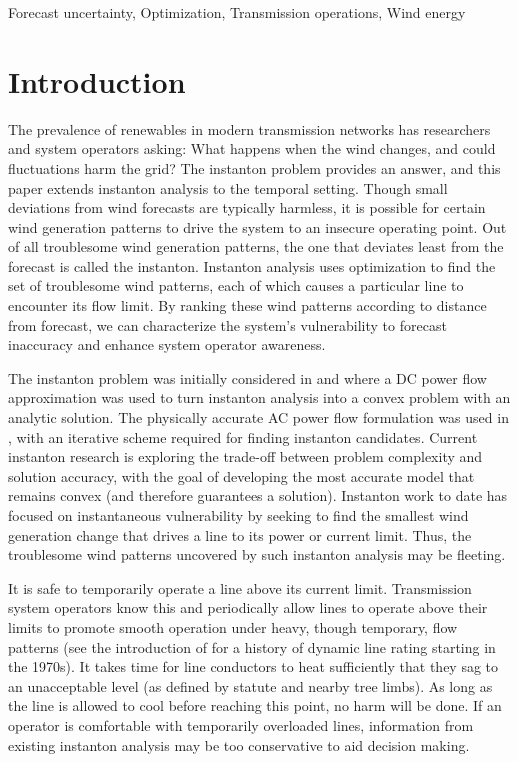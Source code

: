 \documentclass[conference]{IEEEtran}
\begin{document}
\begin{IEEEkeywords}
Forecast uncertainty, Optimization, Transmission operations, Wind energy
\end{IEEEkeywords}


\section{Introduction}

The prevalence of renewables in modern transmission networks has
researchers and system operators asking: What happens when the wind
changes, and could fluctuations harm the grid? The instanton problem
provides an answer, and this paper extends instanton analysis to the
temporal setting. Though small deviations from wind forecasts are
typically harmless, it is possible for certain wind generation
patterns to drive the system to an insecure operating point. Out of
all troublesome wind generation patterns, the one that deviates least
from the forecast is called the instanton. Instanton analysis uses
optimization to find the set of troublesome wind patterns, each of
which causes a particular line to encounter its flow limit. By
ranking these wind patterns according to distance from forecast, we
can characterize the system's vulnerability to forecast inaccuracy and
enhance system operator awareness.

The instanton problem was initially considered in \cite{chertkov2011}
and \cite{chertkov2011a} where a DC power flow approximation was used
to turn instanton analysis into a convex problem with an analytic
solution. The physically accurate AC power flow formulation was used
in \cite{baghsorkhi2012}, with an iterative scheme required for
finding instanton candidates. Current instanton research is exploring
the trade-off between problem complexity and solution accuracy, with
the goal of developing the most accurate model that remains convex
(and therefore guarantees a solution).  Instanton work to date has
focused on instantaneous vulnerability by seeking to find the smallest
wind generation change that drives a line to its power or current
limit. Thus, the troublesome wind patterns uncovered by such instanton
analysis may be fleeting.

It is safe to temporarily operate a line above its current
limit. Transmission system operators know this and periodically allow
lines to operate above their limits to promote smooth operation under
heavy, though temporary, flow patterns (see the introduction of
\cite{banakar2005} for a history of dynamic line rating starting in
the 1970s). It takes time for line conductors to heat sufficiently
that they sag to an unacceptable level (as defined by statute and
nearby tree limbs). As long as the line is allowed to cool before
reaching this point, no harm will be done. If an operator is
comfortable with temporarily overloaded lines, information from
existing instanton analysis may be too conservative to aid decision
making.
\end{document}
